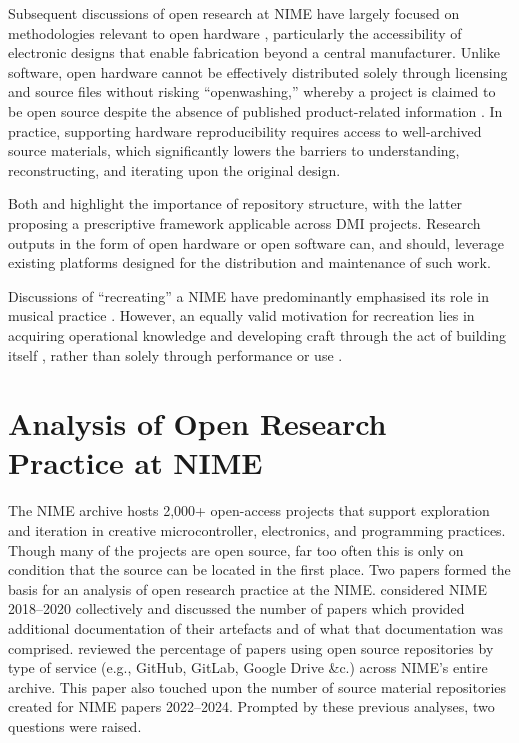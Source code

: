 Subsequent discussions of open research at NIME have largely focused on methodologies relevant to open hardware \citep{calegario_documentation_2021, fiordelmondo_towards_2025}, particularly the accessibility of electronic designs that enable fabrication beyond a central manufacturer. Unlike software, open hardware cannot be effectively distributed solely through licensing and source files \citep{oshwa_best_2013} without risking ``openwashing,'' whereby a project is claimed to be open source despite the absence of published product-related information \citep{bonvoisin_source_2017}. In practice, supporting hardware reproducibility requires access to well-archived source materials, which significantly lowers the barriers to understanding, reconstructing, and iterating upon the original design.

Both \citet{mcpherson_nimehub_2016} and \citet{fiordelmondo_towards_2025} highlight the importance of repository structure, with the latter proposing a prescriptive framework applicable across DMI projects. Research outputs in the form of open hardware or open software can, and should, leverage existing platforms designed for the distribution and maintenance of such work.

Discussions of ``recreating'' a NIME have predominantly emphasised its role in musical practice \citep{ajin_rebuilding_2019, masu_nime_2023, west_towards_2025}. However, an equally valid motivation for recreation lies in acquiring operational knowledge and developing craft through the act of building itself \citep{calegario_documentation_2021}, rather than solely through performance or use \citep{magnusson_epistemic_2009}.



\section{Analysis of Open Research Practice at NIME}\label{sec:current-state}

The NIME archive hosts 2,000+ open-access projects that support exploration and iteration in creative microcontroller, electronics, and programming practices.
Though many of the projects are open source, far too often this is only on condition that the source can be located in the first place.
Two papers \cite{calegario_documentation_2021, fiordelmondo_towards_2025} formed the basis for an analysis of open research practice at the NIME.
\citet{calegario_documentation_2021} considered NIME 2018--2020 collectively and discussed the number of papers which provided additional documentation of their artefacts and of what that documentation was comprised.
\citet{fiordelmondo_towards_2025} reviewed the percentage of papers using open source repositories by type of service (e.g., GitHub, GitLab, Google Drive \&c.) across NIME's entire archive. This paper also touched upon the number of source material repositories created for NIME papers 2022--2024.
Prompted by these previous analyses, two questions were raised.

